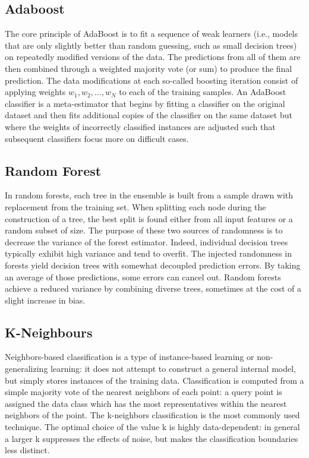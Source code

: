 \documentclass[sigconf]{acmart}
\begin{document}
\subsection{Adaboost}
The core principle of AdaBoost is to fit a sequence of weak learners (i.e., models that are only slightly better than random guessing, such as small decision trees) on repeatedly modified versions of the data. The predictions from all of them are then combined through a weighted majority vote (or sum) to produce the final prediction. The data modifications at each so-called boosting iteration consist of applying weights $w_1, w_2, …,  w_N$ to each of the training samples.\cite{freund1999short}
An AdaBoost classifier is a meta-estimator that begins by fitting a classifier on the original dataset and then fits additional copies of the classifier on the same dataset but where the weights of incorrectly classified instances are adjusted such that subsequent classifiers focus more on difficult cases.

\subsection{Random Forest}
In random forests, each tree in the ensemble is built from a sample drawn with replacement from the training set. When splitting each node during the construction of a tree, the best split is found either from all input features or a random subset of size\cite{liaw2002classification}.
The purpose of these two sources of randomness is to decrease the variance of the forest estimator. Indeed, individual decision trees typically exhibit high variance and tend to overfit. The injected randomness in forests yield decision trees with somewhat decoupled prediction errors. By taking an average of those predictions, some errors can cancel out. Random forests achieve a reduced variance by combining diverse trees, sometimes at the cost of a slight increase in bias.

\subsection{K-Neighbours}
Neighbors-based classification is a type of instance-based learning or non-generalizing learning: it does not attempt to construct a general internal model, but simply stores instances of the training data. Classification is computed from a simple majority vote of the nearest neighbors of each point: a query point is assigned the data class which has the most representatives within the nearest neighbors of the point\cite{chua2006exploiting}.
The k-neighbors classification is the most commonly used technique. The optimal choice of the value k is highly data-dependent: in general a larger k suppresses the effects of noise, but makes the classification boundaries less distinct.
\end{document}
